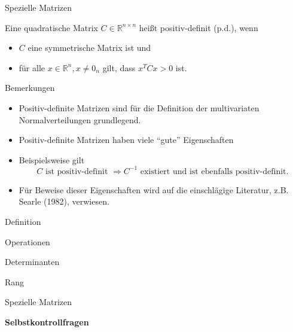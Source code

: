 \documentclass[
  8pt,
  ignorenonframetext,
]{beamer}
\providecommand{\tightlist}{%
  \setlength{\itemsep}{0pt}\setlength{\parskip}{0pt}}
\begin{document}
\begin{frame}{Spezielle Matrizen}
\protect\hypertarget{spezielle-matrizen-5}{}
\footnotesize
\begin{definition}
Eine quadratische Matrix $C \in \mathbb{R}^{n \times n}$ heißt positiv-definit ($\mbox{p.d.}$), wenn
\begin{itemize}
\item $C$ eine symmetrische Matrix ist und
\item für alle $x \in \mathbb{R}^n, x \neq 0_n$ gilt, dass $x^TCx > 0$ ist.
\end{itemize}
\end{definition}

\footnotesize

Bemerkungen

\begin{itemize}
\tightlist
\item
  Positiv-definite Matrizen sind für die Definition der multivariaten
  Normalverteilungen grundlegend.
\item
  Positiv-definite Matrizen haben viele ``gute'' Eigenschaften
\item
  Beispielsweise gilt \begin{equation} 
  C \mbox{ ist positiv-definit } \Rightarrow C^{-1} \mbox{ existiert und ist ebenfalls positiv-definit}.
  \end{equation}
\item
  Für Beweise dieser Eigenschaften wird auf die einschlägige Literatur,
  z.B. Searle (1982), verwiesen.
\end{itemize}
\end{frame}

\begin{frame}{}
\protect\hypertarget{section-8}{}
\large
{}
\vfill

Definition

Operationen

Determinanten

Rang

Spezielle Matrizen

\textbf{Selbstkontrollfragen}

\vfill
\end{frame}
\end{document}
